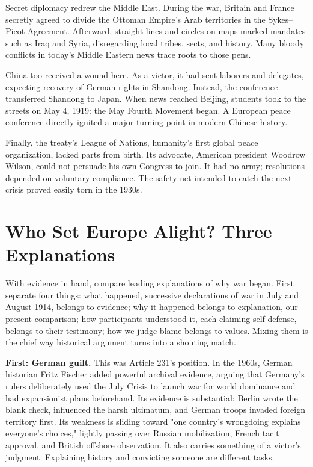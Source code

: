Secret diplomacy redrew the Middle East. During the war, Britain and France secretly agreed to divide the Ottoman Empire's Arab territories in the Sykes--Picot Agreement. Afterward, straight lines and circles on maps marked mandates such as Iraq and Syria, disregarding local tribes, sects, and history. Many bloody conflicts in today's Middle Eastern news trace roots to those pens.

China too received a wound here. As a victor, it had sent laborers and delegates, expecting recovery of German rights in Shandong. Instead, the conference transferred Shandong to Japan. When news reached Beijing, students took to the streets on May 4, 1919: the May Fourth Movement began. A European peace conference directly ignited a major turning point in modern Chinese history.

Finally, the treaty's League of Nations, humanity's first global peace organization, lacked parts from birth. Its advocate, American president Woodrow Wilson, could not persuade his own Congress to join. It had no army; resolutions depended on voluntary compliance. The safety net intended to catch the next crisis proved easily torn in the 1930s.

\section{Who Set Europe Alight? Three Explanations}
With evidence in hand, compare leading explanations of why war began. First separate four things: what happened, successive declarations of war in July and August 1914, belongs to evidence; why it happened belongs to explanation, our present comparison; how participants understood it, each claiming self-defense, belongs to their testimony; how we judge blame belongs to values. Mixing them is the chief way historical argument turns into a shouting match.

\textbf{First: German guilt.} This was Article 231's position. In the 1960s, German historian Fritz Fischer added powerful archival evidence, arguing that Germany's rulers deliberately used the July Crisis to launch war for world dominance and had expansionist plans beforehand. Its evidence is substantial: Berlin wrote the blank check, influenced the harsh ultimatum, and German troops invaded foreign territory first. Its weakness is sliding toward "one country's wrongdoing explains everyone's choices," lightly passing over Russian mobilization, French tacit approval, and British offshore observation. It also carries something of a victor's judgment. Explaining history and convicting someone are different tasks.


